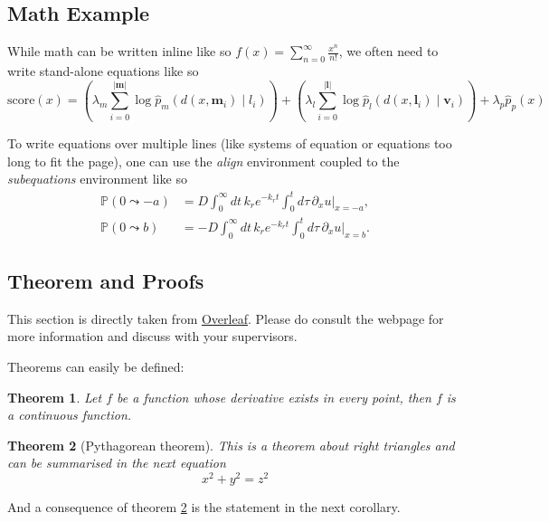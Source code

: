 \documentclass[a4paper,11pt, titlepage]{article}
\theoremstyle{definition}
\theoremstyle{plain}
\newtheorem{theorem}{Theorem}[section]
\theoremstyle{remark}
\begin{document}
\subsection{Math Example}

While math can be written inline like so $f(x) = \sum_{n=0}^{\infty} \frac{x^n}{n!}$, we often need to write stand-alone equations like so
\begin{equation}
\textrm{score}(x) = \left(\lambda_m\sum_{i=0}^{|\mathbf{m}|} \log \hat{p}_m(d(x, \mathbf{m}_i) \mid l_i)\right) + \left(\lambda_l\sum_{i=0}^{|\mathbf{l}|} \log\hat{p}_l(d(x, \mathbf{l}_i) \mid \mathbf{v}_i)\right) + \lambda_p \hat{p}_p(x)
\end{equation}

To write equations over multiple lines (like systems of equation or equations too long to fit the page), one can use the \textit{align} environment coupled to the \textit{subequations} environment like so
\begin{subequations}
\begin{align}
    \mathbb{P}(0 \leadsto -a) &= D\int_0^\infty dt\, k_r e^{-k_r t}\int_0^t d\tau\,\partial_x u \big|_{x=-a}, \\
    \mathbb{P}(0 \leadsto b) &= -D\int_0^\infty dt\, k_r e^{-k_r t}\int_0^t d\tau\,\partial_x u \big|_{x=b}.
\end{align}
\end{subequations}

\subsection{Theorem and Proofs}

This section is directly taken from \href{https://www.overleaf.com/learn/latex/Theorems_and_proofs}{Overleaf}. Please do consult the webpage for more information and discuss with your supervisors. 

Theorems can easily be defined:

\begin{theorem}
Let \(f\) be a function whose derivative exists in every point, then \(f\) is 
a continuous function.
\end{theorem}

\begin{theorem}[Pythagorean theorem]
\label{pythagorean}
This is a theorem about right triangles and can be summarised in the next 
equation 
\[ x^2 + y^2 = z^2 \]
\end{theorem}

And a consequence of theorem \ref{pythagorean} is the statement in the next 
corollary.
\end{document}
